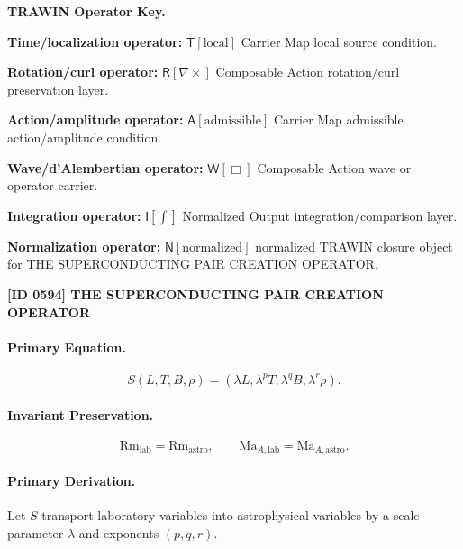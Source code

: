 \par\vspace{0.45\baselineskip}
\noindent\begin{minipage}[t]{\linewidth}
\begingroup
\small
\raggedright
\textbf{TRAWIN Operator Key.}\par
\noindent\textbf{Time/localization operator:} $\mathsf{T}\!\left[\mathrm{local}\right]$ Carrier Map local source condition.\par
\noindent\textbf{Rotation/curl operator:} $\mathsf{R}\!\left[\nabla\times\right]$ Composable Action rotation/curl preservation layer.\par
\noindent\textbf{Action/amplitude operator:} $\mathsf{A}\!\left[\mathrm{admissible}\right]$ Carrier Map admissible action/amplitude condition.\par
\noindent\textbf{Wave/d'Alembertian operator:} $\mathsf{W}\!\left[\Box\right]$ Composable Action wave or operator carrier.\par
\noindent\textbf{Integration operator:} $\mathsf{I}\!\left[\int\right]$ Normalized Output integration/comparison layer.\par
\noindent\textbf{Normalization operator:} $\mathsf{N}\!\left[\mathrm{normalized}\right]$ normalized TRAWIN closure object for THE SUPERCONDUCTING PAIR CREATION OPERATOR.\par
\endgroup
\end{minipage}

\clearpage
\noindent\textbf{[ID 0594] THE SUPERCONDUCTING PAIR CREATION OPERATOR}\par
\vspace{0.35em}
\paragraph{Primary Equation.}
\begin{equation}
S(L,T,B,\rho)
=
(\lambda L,\lambda^{p}T,\lambda^{q}B,\lambda^{r}\rho).
\end{equation}

\paragraph{Invariant Preservation.}
\begin{equation}
\mathrm{Rm}_{\mathrm{lab}}=\mathrm{Rm}_{\mathrm{astro}},
\qquad
\mathrm{Ma}_{A,\mathrm{lab}}=\mathrm{Ma}_{A,\mathrm{astro}}.
\end{equation}

\paragraph{Primary Derivation.}
Let $S$ transport laboratory variables into astrophysical variables by a scale parameter $\lambda$ and exponents $(p,q,r)$.

